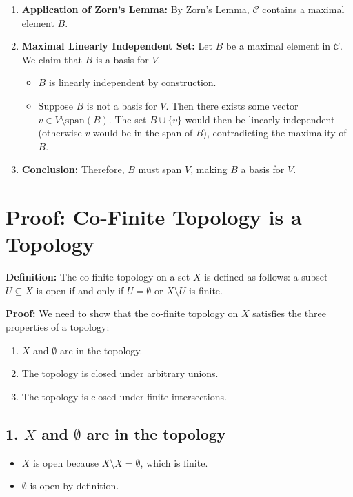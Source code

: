\begin{enumerate}
	\item \textbf{Application of Zorn's Lemma:}
	By Zorn's Lemma, \(\mathcal{C}\) contains a maximal element \(B\).
	
	\item \textbf{Maximal Linearly Independent Set:}
	Let \(B\) be a maximal element in \(\mathcal{C}\). We claim that \(B\) is a basis for \(V\).
	\begin{itemize}
		\item \(B\) is linearly independent by construction.
		\item Suppose \(B\) is not a basis for \(V\). Then there exists some vector \(v \in V \setminus \text{span}(B)\). The set \(B \cup \{v\}\) would then be linearly independent (otherwise \(v\) would be in the span of \(B\)), contradicting the maximality of \(B\).
	\end{itemize}
	
	\item \textbf{Conclusion:}
	Therefore, \(B\) must span \(V\), making \(B\) a basis for \(V\).
\end{enumerate}
\newpage
\section*{Proof: Co-Finite Topology is a Topology}

\textbf{Definition:} The co-finite topology on a set \(X\) is defined as follows: a subset \(U \subseteq X\) is open if and only if \(U = \emptyset\) or \(X \setminus U\) is finite.

\textbf{Proof:} We need to show that the co-finite topology on \(X\) satisfies the three properties of a topology:

\begin{enumerate}
	\item \(X\) and \(\emptyset\) are in the topology.
	\item The topology is closed under arbitrary unions.
	\item The topology is closed under finite intersections.
\end{enumerate}

\subsection*{1. \(X\) and \(\emptyset\) are in the topology}
\begin{itemize}
	\item \(X\) is open because \(X \setminus X = \emptyset\), which is finite.
	\item \(\emptyset\) is open by definition.
\end{itemize}

